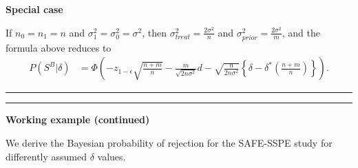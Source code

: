 \documentclass[
]{book}
\begin{document}
\textbf{Special case}

If \(n_0=n_1=n\) and \(\sigma_1^2=\sigma_0^2=\sigma^2\), then \(\sigma_{treat}^2=\frac{2\sigma^2}{n}\) and \(\sigma_{prior}^2=\frac{2\sigma^2}{m}\), and the formula above reduces to
\[
\begin{aligned}
P(S^B|\delta)&=\Phi\left(-z_{1-\epsilon}\sqrt{\frac{n+m}{n}}- \frac{m}{\sqrt{2n\sigma^2}}d-\sqrt{\frac{n}{2n\sigma^2}}\left\{\delta-\delta^*\left(\frac{n+m}{n} \right)\right\} \right).
\end{aligned}
\]

\begin{center}\rule{0.5\linewidth}{0.5pt}\end{center}

\begin{center}\rule{0.5\linewidth}{0.5pt}\end{center}

\textbf{Working example (continued) }

We derive the Bayesian probability of rejection for the SAFE-SSPE study for differently assumed \(\delta\) values.
\end{document}
